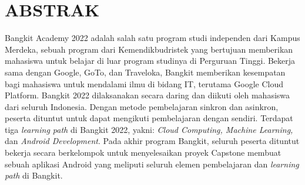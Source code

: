 \chapter*{ABSTRAK}
Bangkit Academy 2022 adalah salah satu program studi independen dari Kampus Merdeka, sebuah program dari Kemendikbudristek yang bertujuan memberikan mahasiswa untuk belajar di luar program studinya di Perguruan Tinggi.  Bekerja sama dengan Google, GoTo, dan Traveloka, Bangkit memberikan kesempatan bagi mahasiswa untuk mendalami ilmu di bidang IT, terutama Google Cloud Platform. Bangkit 2022 dilaksanakan secara daring dan diikuti oleh mahasiswa dari seluruh Indonesia. Dengan metode pembelajaran sinkron dan asinkron, peserta dituntut untuk dapat mengikuti pembelajaran dengan sendiri. Terdapat tiga \textit{learning path} di Bangkit 2022, yakni: \textit{Cloud Computing, Machine Learning,} dan \textit{Android Development}. Pada akhir program Bangkit, seluruh peserta dituntut bekerja secara berkelompok untuk menyelesaikan proyek Capstone membuat sebuah aplikasi Android yang meliputi seluruh elemen pembelajaran dan \textit{learning path} di Bangkit.